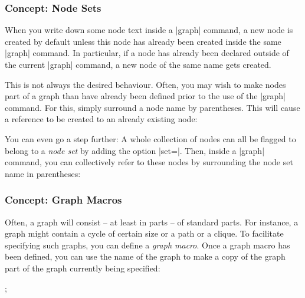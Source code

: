 \subsubsection{Concept: Node Sets}

When you write down some node text inside a |graph| command, a new node is
created by default unless this node has already been created inside the same
|graph| command. In particular, if a node has already been declared outside of
the current |graph| command, a new node of the same name gets created.

This is not always the desired behaviour. Often, you may wish to make nodes
part of a graph than have already been defined prior to the use of the |graph|
command. For this, simply surround a node name by parentheses. This will cause
a reference to be created to an already existing node:
%
\begin{codeexample}[preamble={\usetikzlibrary{graphs}}]
\end{codeexample}

You can even go a step further: A whole collection of nodes can all be flagged
to belong to a \emph{node set} by adding the option |set=|.
Then, inside a |graph| command, you can collectively refer to these nodes by
surrounding the node set name in parentheses:
%
\begin{codeexample}[preamble={\usetikzlibrary{graphs,shapes.geometric}}]
\end{codeexample}


\subsubsection{Concept: Graph Macros}

Often, a graph will consist -- at least in parts -- of standard parts. For
instance, a graph might contain a cycle of certain size or a path or a clique.
To facilitate specifying such graphs, you can define a \emph{graph macro}. Once
a graph macro has been defined, you can use the name of the graph to make a
copy of the graph part of the graph currently being specified:
%
\begin{codeexample}[preamble={\usetikzlibrary{graphs.standard}}]
\tikz {};
\end{codeexample}

